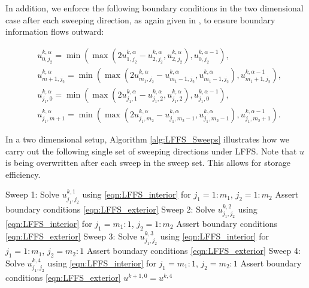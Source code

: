 \documentclass[pdflatex,sn-mathphys-num]{sn-jnl}%
\theoremstyle{thmstyleone}%
\theoremstyle{thmstyletwo}%
\theoremstyle{thmstylethree}%
\begin{document}
In addition, we enforce the following boundary conditions in the two dimensional case after each sweeping direction, as again given in \cite{Kao2004}, to ensure boundary information flows outward:

\begin{align}
    &u_{0,j_2}^{k,\alpha} = \min(\max(2u_{1,j_2}^{k,\alpha} - u_{2,j_2}^{k,\alpha}, u_{2,j_2}^{k,\alpha}), u_{0,j_2}^{k,\alpha-1}), \nonumber \\
    &u_{m+1,j_2}^{k,\alpha} = \min(\max(2u_{m_1,j_2}^{k,\alpha} - u_{m_1-1,j_2}^{k,\alpha}, u_{m_1-1,j_2}^{k,\alpha}), u_{m_1+1,j_2}^{k,\alpha-1}), \nonumber \\
    &u_{j_1,0}^{k,\alpha} = \min(\max(2u_{j_1,1}^{k,\alpha} - u_{j_1,2}^{k,\alpha}, u_{j_1,2}^{k,\alpha}), u_{j_1,0}^{k,\alpha-1}), \nonumber \\
    &u_{j_1,m+1}^{k,\alpha} = \min(\max(2u_{j_1,m_2}^{k,\alpha} - u_{j_1,m_2-1}^{k,\alpha}, u_{j_1,m_2-1}^{k,\alpha}), u_{j_1,m_2+1}^{k,\alpha-1}).
    \label{eqn:LFFS_exterior}
\end{align}


 In a two dimensional setup, Algorithm \ref{alg:LFFS_Sweeps} illustrates how we carry out the following single set of sweeping directions under LFFS. Note that $u$ is being overwritten after each sweep in the sweep set.  This allows for storage efficiency.



 \begin{algorithm} [H]
\scriptsize
\caption{$k$ Sets of 2D LFFS Sweeps}\label{alg:LFFS_Sweeps}
\begin{algorithmic}


\State Sweep 1: Solve $u_{j_1,j_2}^{k,1}$ using \eqref{eqn:LFFS_interior} for $j_1=1:m_1$, $j_2=1:m_2$
\State Assert boundary conditions \eqref{eqn:LFFS_exterior}
\State Sweep 2: Solve $u_{j_1,j_2}^{k,2}$ using \eqref{eqn:LFFS_interior} for $j_1=m_1:1$, $j_2=1:m_2$
\State Assert boundary conditions \eqref{eqn:LFFS_exterior}
\State Sweep 3: Solve $u_{j_1,j_2}^{k,3}$ using \eqref{eqn:LFFS_interior} for $j_1=1:m_1$, $j_2=m_2:1$
\State Assert boundary conditions \eqref{eqn:LFFS_exterior}
\State Sweep 4: Solve $u_{j_1,j_2}^{k,4}$ using \eqref{eqn:LFFS_interior} for $j_1=m_1:1$, $j_2=m_2:1$
\State Assert boundary conditions \eqref{eqn:LFFS_exterior}
\State $u^{k+1,0} = u^{k,4}$ %

\end{algorithmic}
\end{algorithm}
\end{document}
